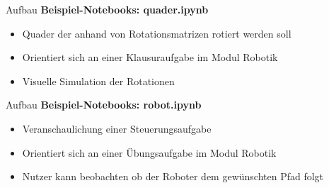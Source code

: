 \documentclass{beamer}
\begin{document}
\begin{frame}{Aufbau}
  \textbf{Beispiel-Notebooks: quader.ipynb}\vspace{0.5em}
  \begin{itemize}
    \setlength{\itemsep}{1em}
    \item Quader der anhand von Rotationsmatrizen rotiert werden soll
    \item Orientiert sich an einer Klausuraufgabe im Modul Robotik
    \item Visuelle Simulation der Rotationen
  \end{itemize}
\end{frame}


\begin{frame}{Aufbau}
  \textbf{Beispiel-Notebooks: robot.ipynb}\vspace{0.5em}
  \begin{itemize}
    \setlength{\itemsep}{1em}
    \item Veranschaulichung einer Steuerungsaufgabe
    \item Orientiert sich an einer Übungsaufgabe im Modul Robotik
    \item Nutzer kann beobachten ob der Roboter dem gewünschten Pfad folgt
  \end{itemize}
\end{frame}
\end{document}
